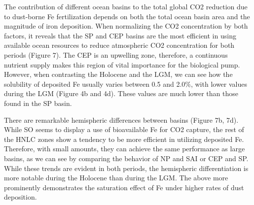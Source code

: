 The contribution of different ocean basins to the total global CO2 reduction due to dust-borne Fe fertilization depends on both the total ocean basin area and the magnitude of iron deposition. When normalizing the CO2 concentration by both factors, it reveals that the SP and CEP basins are the most efficient in using available ocean resources to reduce atmospheric CO2 concentration for both periods (Figure 7). The CEP is an upwelling zone, therefore, a continuous nutrient supply makes this region of vital importance for the biological pump. However, when contrasting the Holocene and the LGM, we can see how the solubility of deposited Fe usually varies between 0.5 and 2.0\%, with lower values during the LGM (Figure 4b and 4d). These values are much lower than those found in the SP basin.  

There are remarkable hemispheric differences between basins (Figure 7b, 7d). While SO seems to display a  use of bioavailable Fe for CO2 capture, the rest of the HNLC zones show a tendency to be more efficient in utilizing deposited Fe. Therefore, with small amounts, they can achieve the same performance as large basins, as we can see by comparing the behavior of NP and SAI or CEP and SP. While these trends are evident in both periods, the hemispheric differentiation is more notable during the Holocene than during the LGM. The above more prominently demonstrates the saturation effect of Fe under higher rates of dust deposition. 

 